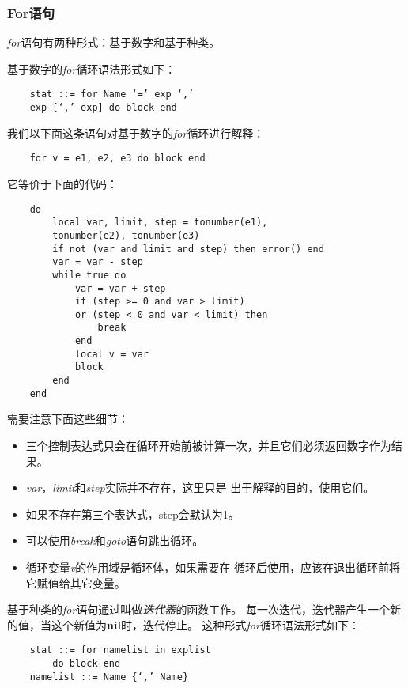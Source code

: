 \documentclass{ctexart}
\begin{document}
\subsubsection{For语句}

\emph{for}语句有两种形式：基于数字和基于种类。

基于数字的\emph{for}循环语法形式如下：

\lstset{language=C}
\begin{lstlisting}
	stat ::= for Name ‘=’ exp ‘,’
	exp [‘,’ exp] do block end
\end{lstlisting}

我们以下面这条语句对基于数字的\emph{for}循环进行解释：

\lstset{language=C}
\begin{lstlisting}
	for v = e1, e2, e3 do block end
\end{lstlisting}

它等价于下面的代码：

\lstset{language=C}
\begin{lstlisting}
	do
		local var, limit, step = tonumber(e1),
		tonumber(e2), tonumber(e3)
		if not (var and limit and step) then error() end
		var = var - step
		while true do
			var = var + step
			if (step >= 0 and var > limit)
			or (step < 0 and var < limit) then
				break
			end
			local v = var
			block
		end
	end
\end{lstlisting}

需要注意下面这些细节：

\begin{itemize}
	\item 三个控制表达式只会在循环开始前被计算一次，并且它们必须返回数字作为结果。
	\item \emph{var}，\emph{limit}和\emph{step}实际并不存在，这里只是
	出于解释的目的，使用它们。
	\item 如果不存在第三个表达式，step会默认为1。
	\item 可以使用\emph{break}和\emph{goto}语句跳出循环。
	\item 循环变量\emph{v}的作用域是循环体，如果需要在
	循环后使用，应该在退出循环前将它赋值给其它变量。
\end{itemize}

基于种类的\emph{for}语句通过叫做\emph{迭代器}的函数工作。
每一次迭代，迭代器产生一个新的值，当这个新值为\textbf{nil}时，迭代停止。
这种形式\emph{for}循环语法形式如下：

\lstset{language=C}
\begin{lstlisting}
	stat ::= for namelist in explist
		do block end
	namelist ::= Name {‘,’ Name}
\end{lstlisting}
\end{document}
